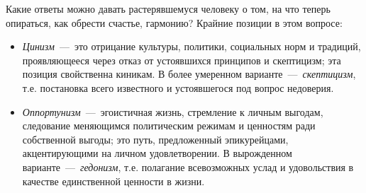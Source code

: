

Какие ответы можно давать растерявшемуся человеку о том, на что теперь опираться, как обрести счастье, гармонию? Крайние позиции в этом вопросе:
\begin{itemize}
    \item \textit{Цинизм}~---~это отрицание культуры, политики, социальных норм и традиций, проявляющееся через отказ от устоявшихся принципов и скептицизм; эта позиция свойственна киникам. В более умеренном варианте~---~\textit{скептицизм}, т.е. постановка всего известного и устоявшегося под вопрос недоверия.
    \item \textit{Оппортунизм}~---~эгоистичная жизнь, стремление к личным выгодам, следование меняющимся политическим режимам и ценностям ради собственной выгоды; это путь, предложенный эпикурейцами, акцентирующими на личном удовлетворении. В вырожденном варианте~---~\textit{гедонизм}, т.е. полагание всевозможных услад и удовольствия в качестве единственной ценности в жизни.
\end{itemize}

